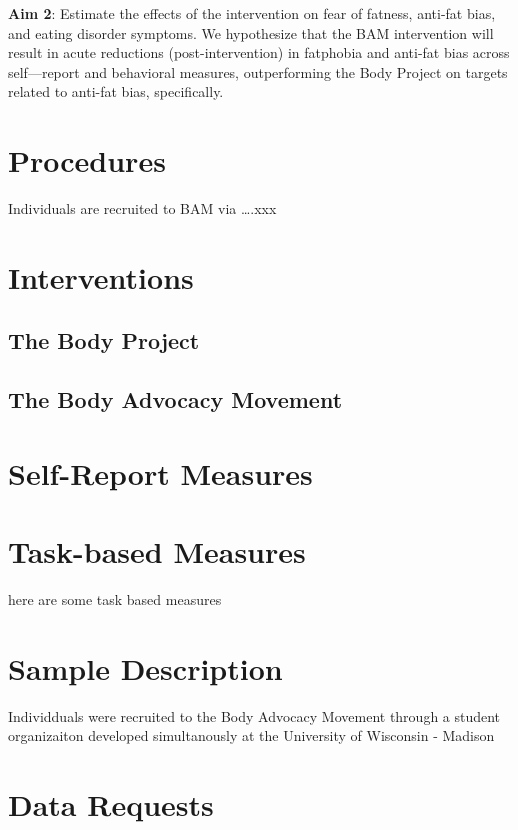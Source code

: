 \documentclass[
]{article}
\begin{document}
\textbf{Aim 2}: Estimate the effects of the intervention on fear of fatness, anti-fat bias, and eating disorder symptoms. We hypothesize that the BAM intervention will result in acute reductions (post-intervention) in fatphobia and anti-fat bias across self---report and behavioral measures, outperforming the Body Project on targets related to anti-fat bias, specifically.

\hypertarget{procedures}{%
\section{Procedures}\label{procedures}}

Individuals are recruited to BAM via \ldots.xxx

\hypertarget{interventions}{%
\section{Interventions}\label{interventions}}

\hypertarget{the-body-project}{%
\subsection{The Body Project}\label{the-body-project}}

\hypertarget{the-body-advocacy-movement}{%
\subsection{The Body Advocacy Movement}\label{the-body-advocacy-movement}}

\hypertarget{self-report-measures}{%
\section{Self-Report Measures}\label{self-report-measures}}

\hypertarget{task-based-measures}{%
\section{Task-based Measures}\label{task-based-measures}}

here are some task based measures

\hypertarget{sample-description}{%
\section{Sample Description}\label{sample-description}}

Individduals were recruited to the Body Advocacy Movement through a student organizaiton developed simultanously at the University of Wisconsin - Madison

\hypertarget{data-requests}{%
\section{Data Requests}\label{data-requests}}

  
\end{document}

